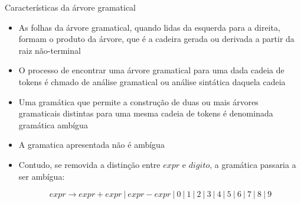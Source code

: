 \begin{frame}[fragile]{Características da árvore gramatical}

    \begin{itemize}
        \item As folhas da árvore gramatical, quando lidas da esquerda para a direita, formam o produto da árvore, que é a cadeira gerada ou derivada a partir
            da raiz não-terminal

        \item O processo de encontrar uma árvore gramatical para uma dada cadeia de tokens é chmado de análise gramatical ou análise sintática daquela cadeia

        \item Uma gramática que permite a construção de duas ou mais árvores gramaticais distintas para uma mesma cadeia de tokens é denominada gramática
            ambígua

        \item A gramatica apresentada não é ambígua

        \item Contudo, se removida a distinção entre $expr$ e $digito$, a gramática passaria a ser ambígua:
        \begin{footnotesize}
        \[
            expr \to expr + expr\ |\ expr - expr\ |\ 0 \ | \  1 \ | \  2 \ | \  3 \ | \  4 \ | \  5 \ | \  6 \ | \  7 \ | \  8 \ | \  9
        \]
        \end{footnotesize}
    \end{itemize}

\end{frame}

